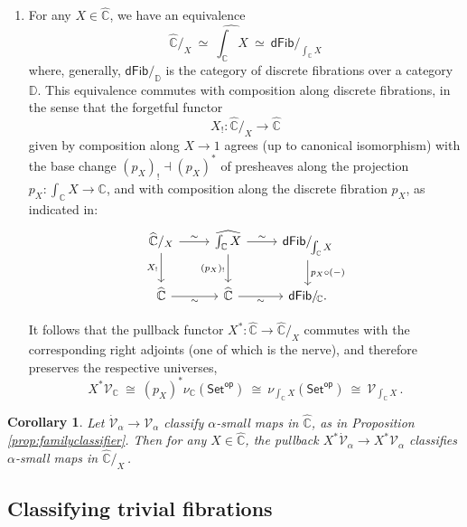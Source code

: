 \documentclass[11pt,reqno]{amsart}
\newcommand{\bbC}{\ensuremath{\mathbb{C}}}
\newcommand{\Set}{\ensuremath{\mathsf{Set}}}
\renewcommand{\to}{\ensuremath{\rightarrow}}
\newcommand{\V}{\ensuremath{\mathcal{V}}}
\newcommand{\VV}{\ensuremath{\dot{\mathcal{V}}}}
\newtheorem{corollary}[theorem]{Corollary}
\theoremstyle{remark}
\theoremstyle{definition}
\begin{document}
\begin{enumerate}
\item For any $X\in \widehat{\bbC}$, we have an equivalence 
\[
\widehat{\bbC}/_X\ %
\simeq\ \widehat{\textstyle \int_{\bbC}X}\ \simeq\ \mathsf{dFib}/_{\!\int_{\bbC}X}
\]
where, generally, $\mathsf{dFib}/_{\mathbb{D}}$ is the category of discrete fibrations over a category $\mathbb{D}$.
This equivalence commutes with composition along discrete fibrations, in the sense that the forgetful functor 
\[
{X_!}: \widehat{\bbC}/_X \to \widehat{\bbC}
\]
 given by composition along $X \to 1$ agrees (up to canonical isomorphism) with the base change $(p_X)_! \dashv (p_X)^*$ of presheaves along the projection  ${\textstyle  p_X : \int_{\bbC}X \to  \bbC}$, and with composition along the discrete fibration $p_X$, as indicated in:
\begin{equation}\label{diagram:sliceuniversepullsback}
\begin{tikzcd}
\widehat{\bbC}/_X  \ar[d,swap,"{{X_!}}"] \ar[r, "{\sim}"] 
	& \widehat{\textstyle \int_{\bbC}X} \ar[d,swap,"{{(p_X)_!}}"] \ar[r, "{\sim}"] 
		& \mathsf{dFib}/_{\!\int_{\bbC}X} \ar[d,"p_X\circ(-)"]  \\
 \widehat{\bbC}  \ar[r,swap, "{\sim}"]   & \widehat{\bbC}  \ar[r,swap, "{\sim}"] 
	&  \mathsf{dFib}/_{\!\bbC}.
\end{tikzcd}
\end{equation}

It follows that the pullback functor $X^* : \widehat{\bbC} \to \widehat{\bbC}/_X$ commutes with the corresponding right adjoints (one of which is the nerve), and therefore preserves the respective universes, 
\[\textstyle
 X^* \V_{\bbC} \ 
   \cong\ (p_X)^* \nu_{\bbC}(\Set^{\mathsf{op}}) \ 
   \cong\  \nu_{\int_{\bbC}X}(\Set^{\mathsf{op}}) \ 
   \cong\  \V_{ \int_{\bbC}X} \,.
 \]
\end{enumerate}

 \begin{corollary}\label{prop:familyclassifierforslices}
Let $\VV_\alpha\to\V_\alpha$ classify $\alpha$-small maps in $\widehat{\bbC}$, as in Proposition \ref{prop:familyclassifier}.  Then for any $X\in \widehat{\bbC}$, the pullback $X^*\VV_\alpha\to X^*\V_\alpha$ classifies 
$\alpha$-small maps in $\widehat{\bbC}/_X$\,.
\end{corollary}

\subsection*{Classifying trivial fibrations}
\end{document}
